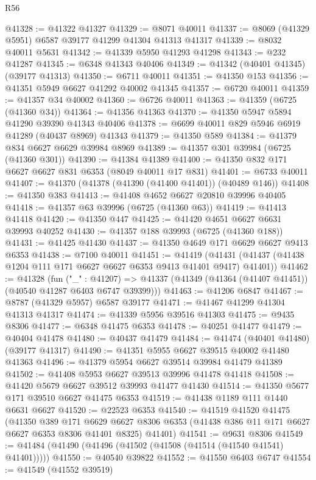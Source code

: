 \begin{lexlean}{R56}
\begin{coremodule}
@41328 := @41322 @41327
@41329 := @8071 @40011
@41337 := @8069 (@41329 @5951) @6587 @39177 @41299 @41304 @41313 @41317
@41339 := @8032 @40011 @5631
@41342 := @41339 @5950 @41293 @41298
@41343 := @232 @41287
@41345 := @6348 @41343 @40406
@41349 := @41342 (@40401 @41345) (@39177 @41313)
@41350 := @6711 @40011
@41351 := @41350 @153
@41356 := @41351 @5949 @6627 @41292 @40002 @41345
@41357 := @6720 @40011
@41359 := @41357 @34 @40002
@41360 := @6726 @40011
@41363 := @41359 (@6725 (@41360 @34))
@41364 := @41356 @41363
@41370 := @41350 @5947 @5894 @41290 @39390 @41343 @40406
@41378 := @6699 @40011 @829 @5946 @6919 @41289 (@40437 @8969) @41343
@41379 := @41350 @589
@41384 := @41379 @834 @6627 @6629 @39984 @8969
@41389 := @41357 @301 @39984 (@6725 (@41360 @301))
@41390 := @41384 @41389
@41400 := @41350 @832 @171 @6627 @6627 @831 @6353 (@8049 @40011 @17 @831)
@41401 := @6733 @40011
@41407 := @41370 (@41378 (@41390 (@41400 @41401)) (@40489 @146))
@41408 := @41350 @383
@41413 := @41408 @4652 @6627 @20810 @39996 @40405
@41418 := @41357 @63 @39996 (@6725 (@41360 @63))
@41419 := @41413 @41418
@41420 := @41350 @447
@41425 := @41420 @4651 @6627 @6631 @39993 @40252
@41430 := @41357 @188 @39993 (@6725 (@41360 @188))
@41431 := @41425 @41430
@41437 := @41350 @4649 @171 @6629 @6627 @9413 @6353
@41438 := @7100 @40011
@41451 := @41419
    (@41431 (@41437 (@41438 @1204 @111 @171 @6627 @6627 @6353 @9413 @41401 @9417) @41401))
@41462 := @41328
    (fun ("_" : @41207) =>
    @41337 (@41349 (@41364 (@41407 @41451)) (@40540 @41287 @6403 @6747 @39399)))
@41463 := @41206 @6847
@41467 := @8787 (@41329 @5957) @6587 @39177
@41471 := @41467 @41299 @41304 @41313 @41317
@41474 := @41339 @5956 @39516 @41303
@41475 := @9435 @8306
@41477 := @6348 @41475 @6353
@41478 := @40251 @41477
@41479 := @40404 @41478
@41480 := @40437 @41479
@41484 := @41474 (@40401 @41480) (@39177 @41317)
@41490 := @41351 @5955 @6627 @39515 @40002 @41480 @41363
@41496 := @41379 @5954 @6627 @39514 @39984 @41479 @41389
@41502 := @41408 @5953 @6627 @39513 @39996 @41478 @41418
@41508 := @41420 @5679 @6627 @39512 @39993 @41477 @41430
@41514 := @41350 @5677 @171 @39510 @6627 @41475 @6353
@41519 := @41438 @1189 @111 @1440 @6631 @6627
@41520 := @22523 @6353
@41540 := @41519
    @41520
    @41475
    (@41350
      @389
      @171
      @6629
      @6627
      @8306
      @6353
      (@41438 @386 @11 @171 @6627 @6627 @6353 @8306 @41401 @8325)
      @41401)
@41541 := @9631 @8306
@41549 := @41484 (@41490 (@41496 (@41502 (@41508 (@41514 (@41540 @41541) @41401)))))
@41550 := @40540 @39822
@41552 := @41550 @6403 @6747
@41554 := @41549 (@41552 @39519)

\end{coremodule}
\end{lexlean}
